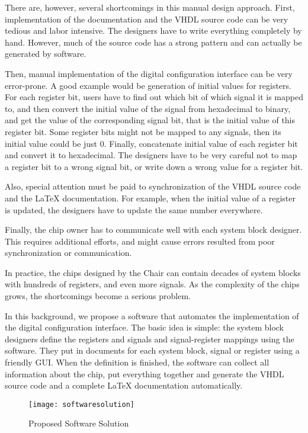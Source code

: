 There are, however, several shortcomings in this manual design approach. First, implementation of the documentation and the VHDL source code can be very tedious and labor intensive. The designers have to write everything completely by hand. However, much of the source code has a strong pattern and can actually be generated by software.

Then, manual implementation of the digital configuration interface can be very error-prone. A good example would be generation of initial values for registers. For each register bit, users have to find out which bit of which signal it is mapped to, and then convert the initial value of the signal from hexadecimal to binary, and get the value of the corresponding signal bit, that is the initial value of this register bit. Some register bits might not be mapped to any signals, then its initial value could be just 0. Finally, concatenate initial value of each register bit and convert it to hexadecimal. The designers have to be very careful not to map a register bit to a wrong signal bit, or write down a wrong value for a register bit.

Also, special attention must be paid to synchronization of the VHDL source code and the LaTeX documentation. For example, when the initial value of a register is updated, the designers have to update the same number everywhere.

Finally, the chip owner has to communicate well with each system block designer. This requires additional efforts, and might cause errors resulted from poor synchronization or communication.

In practice, the chips designed by the Chair can contain decades of system blocks with hundreds of registers, and even more signals. As the complexity of the chips grows, the shortcomings become a serious problem. 

In this background, we propose a software that automates the implementation of the digital configuration interface. The basic idea is simple: the system block designers define the registers and signals and signal-register mappings using the software. They put in documents for each system block, signal or register using a friendly GUI. When the definition is finished, the software can collect all information about the chip, put everything together and generate the VHDL source code and a complete LaTeX documentation automatically.

\begin{figure}[htbp]
\centering
\texttt{[image: softwaresolution]}
\caption{Proposed Software Solution\label{fig:Proposed Software Solution}}
\end{figure}

